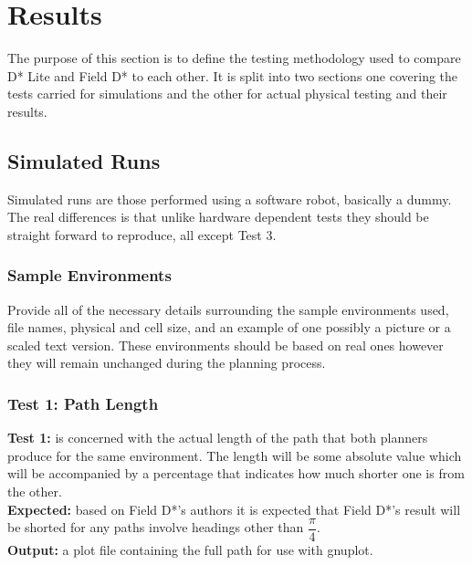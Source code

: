 \chapter{Results}

\noindent
The purpose of this section is to define the testing methodology used to compare D* Lite and Field D* to each other. It is split into two sections one covering the tests carried for simulations and the other for actual physical testing and their results.


\section{Simulated Runs}

\noindent
Simulated runs are those performed using a software robot, basically a dummy. The real differences is that unlike hardware dependent tests they should be straight forward to reproduce, all except Test 3.

\subsection{Sample Environments}

\noindent
Provide all of the necessary details surrounding the sample environments used, file names, physical and cell size, and an example of one possibly a picture or a scaled text version. These environments should be based on real ones however they will remain unchanged during the planning process.

\subsection{Test 1: Path Length}

\noindent
\textbf{Test 1:} is concerned with the actual length of the path that both planners produce for the same environment. The length will be some absolute value which will be accompanied by a percentage that indicates how much shorter one is from the other.\\

\noindent
\textbf{Expected:} based on Field D*'s authors it is expected that Field D*'s result will be shorted for any paths involve headings other than $\dfrac{\pi}{4}$.\\

\noindent
\textbf{Output:} a plot file containing the full path for use with gnuplot.

